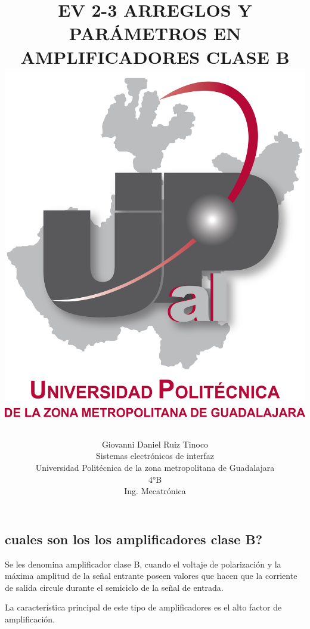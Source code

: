 \documentclass[12pt,a4paper]{article}
\title{EV 2-3 ARREGLOS Y PARÁMETROS EN AMPLIFICADORES CLASE B
\includegraphics [scale=1]{imagenes/UPZMG.png} 
\author{Giovanni Daniel Ruiz Tinoco\\
\small Sistemas electrónicos de interfaz\\
  \small Universidad Politécnica de la zona metropolitana de Guadalajara\\
  \small 4°B \\
  \small Ing. Mecatrónica\\
\centering
\linebreak
}
}
\begin{document}
\maketitle
\newpage
\begin{flushleft}
\section {cuales son los los amplificadores clase B?}
\end{flushleft}
Se les denomina amplificador clase B, cuando el voltaje de polarización y la máxima amplitud de la señal entrante poseen valores que hacen que la corriente de salida circule durante el semiciclo de la señal de entrada.

La característica principal de este tipo de amplificadores es el alto factor de amplificación. 
\end{document}
